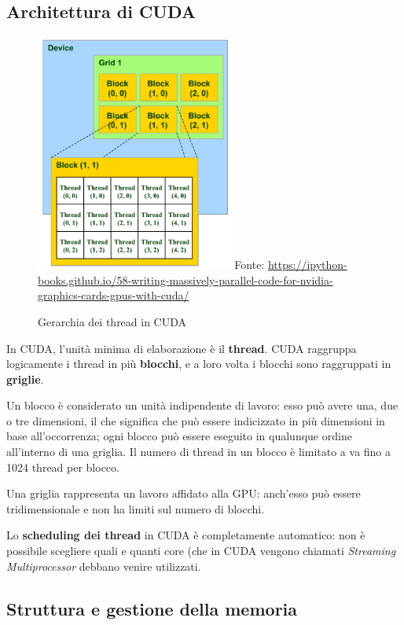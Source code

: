 \documentclass[12pt,a4paper,openright,twoside]{report}
\begin{document}
\subsection{Architettura di CUDA}

\begin{figure}[h]
    \centering{}
    \def\stackalignment{r}
    \stackunder
        {\includegraphics[width=6.5cm]{grids-and-blocks.png}}
        {\scriptsize Fonte: \url{https://ipython-books.github.io/58-writing-massively-parallel-code-for-nvidia-graphics-cards-gpus-with-cuda/}}
    \caption{Gerarchia dei thread in CUDA}
    \label{img:grids-and-blocks}
\end{figure}

In CUDA, l'unità minima di elaborazione è il \textbf{thread}. CUDA raggruppa logicamente i thread in più \textbf{blocchi}, e a loro volta i blocchi sono raggruppati in \textbf{griglie}.

Un blocco è considerato un unità indipendente di lavoro: esso può avere una, due o tre dimensioni, il che significa che può essere indicizzato in più dimensioni in base all'occorrenza; ogni blocco può essere eseguito in qualunque ordine all'interno di una griglia. Il numero di thread in un blocco è limitato a va fino a 1024 thread per blocco.

Una griglia rappresenta un lavoro affidato alla GPU: anch'esso può essere tridimensionale e non ha limiti sul numero di blocchi.

Lo \textbf{scheduling dei thread} in CUDA è completamente automatico: non è possibile scegliere quali e quanti core (che in CUDA vengono chiamati \textit{Streaming Multiprocessor} debbano venire utilizzati.

\subsection{Struttura e gestione della memoria}
\end{document}
